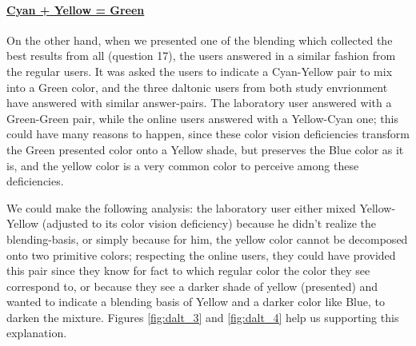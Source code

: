 \paragraph{\ul{Cyan + Yellow = Green}}
%
On the other hand, when we presented one of the blending which collected the best results from all (question 17), the users answered in a similar fashion from the regular users. It was asked the users to indicate a Cyan-Yellow pair to mix into a Green color, and the three daltonic users from both study envrionment have
answered with similar answer-pairs. The laboratory user answered with a Green-Green pair, while the online users answered with a Yellow-Cyan one; this could have many reasons to happen, since these color vision deficiencies transform the Green presented color onto a Yellow shade, but preserves the Blue color as it is, and
the yellow color is a very common color to perceive among these deficiencies. \par
%
We could make the following analysis: the laboratory user either mixed Yellow-Yellow (adjusted to its color vision deficiency) because he didn't realize the blending-basis, or simply because for him, the yellow color cannot be decomposed onto two primitive colors; respecting the online users, they could have provided this
pair since they know for fact to which regular color the color they see correspond to, or because they see a darker shade of yellow (presented) and wanted to indicate a blending basis of Yellow and a darker color like Blue, to darken the mixture. Figures \ref{fig:dalt_3} and \ref{fig:dalt_4} help us supporting this explanation.
%

